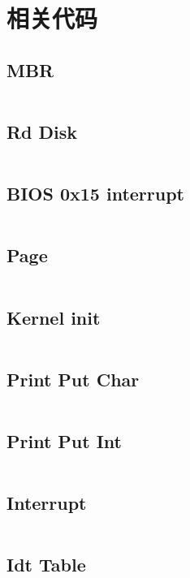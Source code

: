 \chapter{相关代码}%
\section{MBR}
\label{fsec:mbr}
\inputminted{nasm}{./code/mbr.S}

\section{Rd Disk}
\label{fsec:loader_disk}
\inputminted{nasm}{./code/loader_disk.S}

\section{BIOS 0x15 interrupt}
\label{fsec:loader_15h}
\inputminted{nasm}{./code/loader_15h.S}

\section{Page}
\label{fsec:loader_page}
\inputminted{nasm}{./code/loader_page.S}

\section{Kernel init}
\label{fsec:kernel_init}
\inputminted{nasm}{./code/kernel_init.S}

\section{Print Put Char}
\label{fsec:put_char}
\inputminted{nasm}{./code/put_char.S}

\section{Print Put Int}
\label{fsec:put_int}
\inputminted{nasm}{./code/put_int.S}

\section{Interrupt}
\label{app:int_a}
\inputminted{nasm}{./code/int_a.S}

\section{Idt Table}
\label{app:int_b}
\inputminted{c}{./code/idt_b.c}

